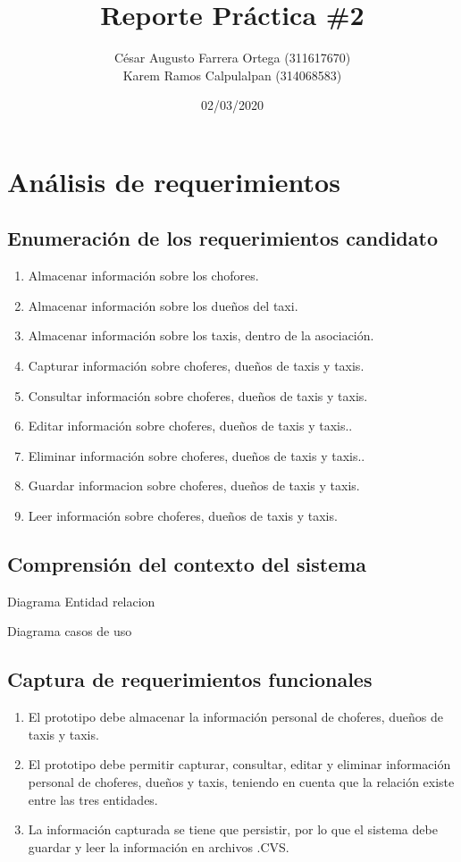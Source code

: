 \documentclass[
	10pt, %
	spanish %
]{fphw}
\title{Reporte Práctica \#2} %
\author{César Augusto Farrera Ortega (311617670) \\ Karem Ramos Calpulalpan (314068583)} %
\date{02/03/2020} %
\institute{UNAM \\ Facultad de Ciencias} %
\begin{document}
\maketitle %


\section*{Análisis de requerimientos}


\subsection*{Enumeración de los requerimientos candidato}
\begin{enumerate}
	\item Almacenar información sobre los chofores.
	\item Almacenar información sobre los dueños del taxi.
	\item Almacenar información sobre los taxis, dentro de la asociación.
	\item Capturar información sobre choferes, dueños de taxis y taxis.
	\item Consultar información sobre choferes, dueños de taxis y taxis.
	\item Editar información sobre choferes, dueños de taxis y taxis..
	\item Eliminar información sobre choferes, dueños de taxis y taxis..
	\item Guardar informacion sobre choferes, dueños de taxis y taxis.
	\item Leer información sobre choferes, dueños de taxis y taxis.
\end{enumerate}

\subsection*{Comprensión del contexto del sistema}


Diagrama Entidad relacion


Diagrama casos de uso

\subsection*{Captura de requerimientos funcionales}
\begin{enumerate}
	\item El prototipo debe almacenar la información  personal de choferes, dueños de taxis y taxis.
	\item El prototipo debe permitir capturar, consultar, editar y eliminar información personal de choferes, dueños y taxis, 		teniendo en cuenta que la relación existe entre las tres entidades.
	\item La información capturada se tiene que persistir, por lo que el sistema debe guardar y leer la información en 				archivos .CVS.
\end{enumerate}
\end{document}
